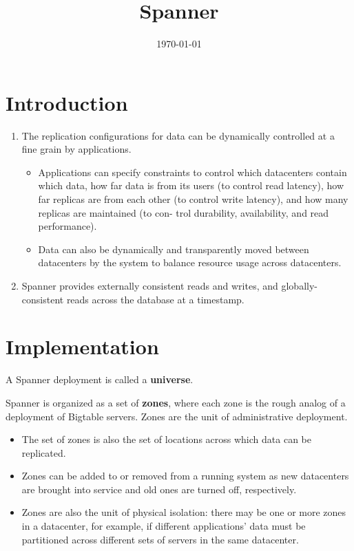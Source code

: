 \documentclass[11pt]{article}
\date{\today}
\title{Spanner}
\begin{document}
\maketitle
\section{Introduction}
\label{sec:orge4cf46b}
\begin{enumerate}
\item The replication configurations for data can be dynamically controlled at a fine grain by
applications.
\begin{itemize}
\item Applications can specify constraints to control which datacenters contain which data, how far
data is from its users (to control read latency), how far replicas are from each other (to
control write latency), and how many replicas are maintained (to con- trol durability, availability, and read performance).
\item Data can also be dynamically and transparently moved between datacenters by the system to balance resource usage across datacenters.
\end{itemize}
\item Spanner provides externally consistent reads and writes, and globally-consistent reads across the
database at a timestamp.
\end{enumerate}
\section{Implementation}
\label{sec:org2beb16d}
A Spanner deployment is called a \textbf{universe}.

Spanner is organized as a set of \textbf{zones}, where each zone is the rough analog of a deployment of
Bigtable servers. Zones are the unit of administrative deployment.
\begin{itemize}
\item The set of zones is also the set of locations across which data can be replicated.
\item Zones can be added to or removed from a running system as new datacenters are brought into service
and old ones are turned off, respectively.
\item Zones are also the unit of physical isolation: there may be one or more zones in a datacenter, for
example, if different applications’ data must be partitioned across different sets of servers in the
same datacenter.
\end{itemize}
\end{document}
